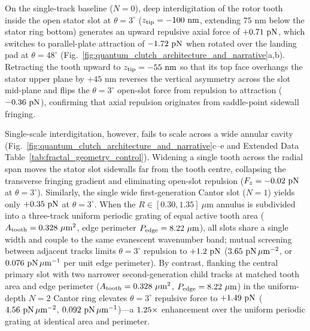 \documentclass[pdflatex,sn-nature]{sn-jnl}
\DeclareRobustCommand{\roundtwo}[1]{\fpeval{round(#1,2)}}
\DeclareRobustCommand{\roundthree}[1]{\fpeval{round(#1,3)}}
\begin{document}
On the single-track baseline ($N=0$), deep interdigitation of the rotor tooth inside the open stator slot at $\theta=3^\circ$ ($z_{\rm tip} = -100\text{ nm}$, extending $75\text{ nm}$ below the stator ring bottom) generates an upward repulsive axial force of $+\roundtwo{\SingletoothTrackzeroBemThetathreeFZPn}\text{ pN}$, which switches to parallel-plate attraction of $\roundtwo{\SingletoothTrackzeroBemThetafoureightFZPn}\text{ pN}$ when rotated over the landing pad at $\theta=48^\circ$ (Fig.~\ref{fig:quantum_clutch_architecture_and_narrative}a,b). Retracting the tooth upward to $z_{\rm tip} = -55\text{ nm}$ so that its top face overhangs the stator upper plane by $+45\text{ nm}$ reverses the vertical asymmetry across the slot mid-plane and flips the $\theta=3^\circ$ open-slot force from repulsion to attraction ($\roundtwo{\SingletoothTrackzeroOverhangBemThetathreeFZPn}\text{ pN}$), confirming that axial repulsion originates from saddle-point sidewall fringing\cite{levin2010}.

Single-scale interdigitation, however, fails to scale across a wide annular cavity (Fig.~\ref{fig:quantum_clutch_architecture_and_narrative}c--e and Extended Data Table~\ref{tab:fractal_geometry_control}). Widening a single tooth across the radial span moves the stator slot sidewalls far from the tooth centre, collapsing the transverse fringing gradient and eliminating open-slot repulsion ($F_z = \roundtwo{\CtrlSinglewideBemThetathreeFZPn}\text{ pN}$ at $\theta=3^\circ$). Similarly, the single wide first-generation Cantor slot ($N=1$) yields only $+\roundtwo{\FractalNoneFundringBemThetathreeFZPn}\text{ pN}$ at $\theta=3^\circ$. When the $R \in [0.30, 1.35]\ \mu\text{m}$ annulus is subdivided into a three-track uniform periodic grating of equal active tooth area ($A_{\rm tooth} = \roundthree{\FractalCtrlUniformperiodicActiveToothAreaUmtwo}\ \mu\text{m}^2$, edge perimeter $P_{\rm edge} = \roundtwo{\FractalCtrlUniformperiodicEdgePerimeterUm}\ \mu\text{m}$), all slots share a single width and couple to the same evanescent wavenumber band; mutual screening between adjacent tracks limits $\theta=3^\circ$ repulsion to $+\roundtwo{\CtrlUniformperiodicBemThetathreeFZPn}\text{ pN}$ ($\roundtwo{\NatureCtrlUniformperiodicFRepPnPerToothAreaUmtwo}\text{ pN}\,\mu\text{m}^{-2}$, or $\roundthree{\FractalCtrlUniformperiodicFRepPnPerUm}\text{ pN}\,\mu\text{m}^{-1}$ per unit edge perimeter). By contrast, flanking the central primary slot with two narrower second-generation child tracks at matched tooth area and edge perimeter ($A_{\rm tooth} = \roundthree{\FractalCantorFlatzActiveToothAreaUmtwo}\ \mu\text{m}^2$, $P_{\rm edge} = \roundtwo{\FractalCantorFlatzEdgePerimeterUm}\ \mu\text{m}$) in the uniform-depth $N=2$ Cantor ring elevates $\theta=3^\circ$ repulsive force to $+\roundtwo{\CantorNtwoFlatzBemThetathreeFZPn}\text{ pN}$ ($\roundtwo{\NatureCantorNtwoFlatzFRepPnPerToothAreaUmtwo}\text{ pN}\,\mu\text{m}^{-2}$, $\roundthree{\FractalCantorFlatzFRepPnPerUm}\text{ pN}\,\mu\text{m}^{-1}$)---a $1.25{}\times$ enhancement over the uniform periodic grating at identical area and perimeter.
\end{document}

